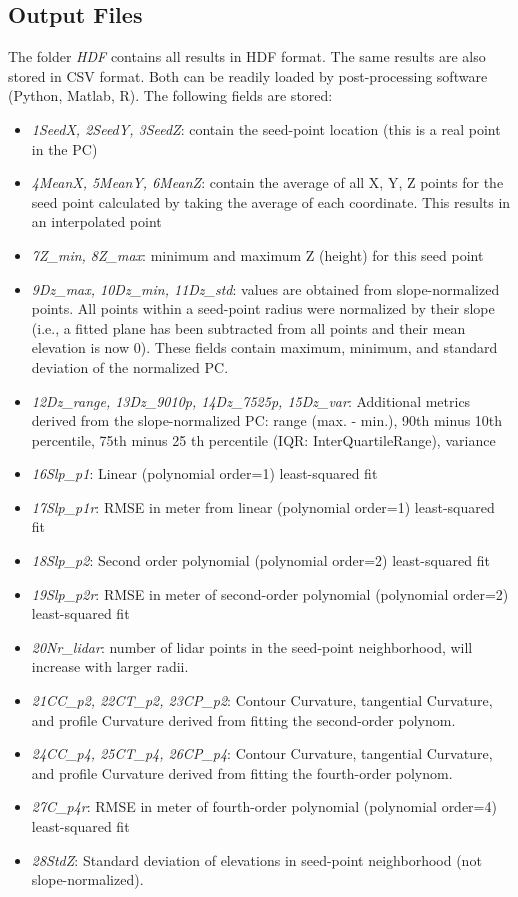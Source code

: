 \documentclass[a4paperpaper,,tablecaptionabove]{scrartcl}
\providecommand{\tightlist}{%
  \setlength{\itemsep}{0pt}\setlength{\parskip}{0pt}}
\begin{document}
\hypertarget{output-files}{%
\subsection{Output Files}\label{output-files}}

The folder \emph{HDF} contains all results in HDF format. The same
results are also stored in CSV format. Both can be readily loaded by
post-processing software (Python, Matlab, R). The following fields are
stored:

\begin{itemize}
\tightlist
\item
  \emph{1SeedX, 2SeedY, 3SeedZ}: contain the seed-point location (this
  is a real point in the PC)
\item
  \emph{4MeanX, 5MeanY, 6MeanZ}: contain the average of all X, Y, Z
  points for the seed point calculated by taking the average of each
  coordinate. This results in an interpolated point
\item
  \emph{7Z\_min, 8Z\_max}: minimum and maximum Z (height) for this seed
  point
\item
  \emph{9Dz\_max, 10Dz\_min, 11Dz\_std}: values are obtained from
  slope-normalized points. All points within a seed-point radius were
  normalized by their slope (i.e., a fitted plane has been subtracted
  from all points and their mean elevation is now 0). These fields
  contain maximum, minimum, and standard deviation of the normalized PC.
\item
  \emph{12Dz\_range, 13Dz\_9010p, 14Dz\_7525p, 15Dz\_var}: Additional
  metrics derived from the slope-normalized PC: range (max. - min.),
  90th minus 10th percentile, 75th minus 25 th percentile (IQR:
  InterQuartileRange), variance
\item
  \emph{16Slp\_p1}: Linear (polynomial order=1) least-squared fit
\item
  \emph{17Slp\_p1r}: RMSE in meter from linear (polynomial order=1)
  least-squared fit
\item
  \emph{18Slp\_p2}: Second order polynomial (polynomial order=2)
  least-squared fit
\item
  \emph{19Slp\_p2r}: RMSE in meter of second-order polynomial
  (polynomial order=2) least-squared fit
\item
  \emph{20Nr\_lidar}: number of lidar points in the seed-point
  neighborhood, will increase with larger radii.
\item
  \emph{21CC\_p2, 22CT\_p2, 23CP\_p2}: Contour Curvature, tangential
  Curvature, and profile Curvature derived from fitting the second-order
  polynom.
\item
  \emph{24CC\_p4, 25CT\_p4, 26CP\_p4}: Contour Curvature, tangential
  Curvature, and profile Curvature derived from fitting the fourth-order
  polynom.
\item
  \emph{27C\_p4r}: RMSE in meter of fourth-order polynomial (polynomial
  order=4) least-squared fit
\item
  \emph{28StdZ}: Standard deviation of elevations in seed-point
  neighborhood (not slope-normalized).
\end{itemize}
\end{document}
